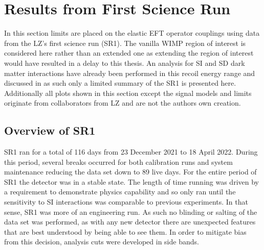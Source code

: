 \section{Results from First Science Run}
\par
In this section limits are placed on the elastic EFT operator couplings using data from the LZ's first science run (SR1).
The vanilla WIMP region of interest is considered here rather than an extended one as extending the region of interest would have resulted in a delay to this thesis.
An analysis for SI and SD dark matter interactions have already been performed in this recoil energy range \cite{lz_ws_sr1_ref} and discussed in \cite{marisarthurs_thesis_ref} as such only a limited summary of the SR1 is presented here.
Additionally all plots shown in this section except the signal models and limits originate from collaborators from LZ and are not the authors own creation.

\subsection{Overview of SR1}
\par
SR1 ran for a total of 116 days from 23 December 2021 to 18 April 2022.
During this period, several breaks occurred for both calibration runs and system maintenance reducing the data set down to 89 live days.
For the entire period of SR1 the detector was in a stable state.
The length of time running was driven by a requirement to demonstrate physics capability and so only ran until the sensitivity to SI interactions was comparable to previous experiments.
In that sense, SR1 was more of an engineering run.
As such no blinding or salting of the data set was performed, as with any new detector there are unexpected features that are best understood by being able to see them.
In order to mitigate bias from this decision, analysis cuts were developed in side bands.


